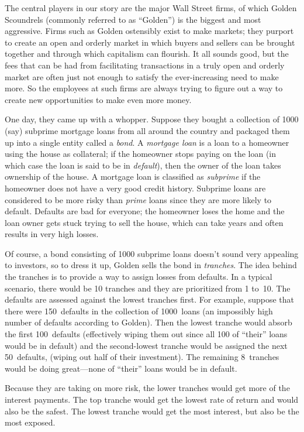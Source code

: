 The central players in our story are the major Wall Street firms, of
which Golden Scoundrels (commonly referred to as ``Golden'') is the
biggest and most aggressive.  Firms such as Golden ostensibly exist to
make markets; they purport to create an open and orderly market in
which buyers and sellers can be brought together and through which
capitalism can flourish.  It all sounds good, but the fees that can be
had from facilitating transactions in a truly open and orderly market
are often just not enough to satisfy the ever-increasing need to make
more.  So the employees at such firms are always trying to figure out
a way to create new opportunities to make even more money.

One day, they came up with a whopper.  Suppose they bought a
collection of 1000 (say) subprime mortgage loans from all around the
country and packaged them up into a single entity called a
\emph{bond}.  A \emph{mortgage loan} is a loan to a homeowner using
the house as collateral; if the homeowner stops paying on the loan (in
which case the loan is said to be in \emph{default}), then the owner
of the loan takes ownership of the house.  A mortgage loan is
classified as \emph{subprime} if the homeowner does not have a very
good credit history.  Subprime loans are considered to be more risky
than \emph{prime} loans since they are more likely to default.
Defaults are bad for everyone; the homeowner loses the home and the
loan owner gets stuck trying to sell the house, which can take years
and often results in very high losses.

Of course, a bond consisting of 1000 subprime loans doesn't sound very
appealing to investors, so to dress it up, Golden sells the bond in
\emph{tranches}.  The idea behind the tranches is to provide a way to
assign losses from defaults.  In a typical scenario, there would be 10
tranches and they are prioritized from 1 to~10.  The defaults are
assessed against the lowest tranches first.  For example, suppose that
there were 150~defaults in the collection of 1000~loans (an impossibly
high number of defaults according to Golden).  Then the lowest tranche
would absorb the first 100~defaults (effectively wiping them out since
all 100 of ``their'' loans would be in default) and the second-lowest
tranche would be assigned the next 50~defaults, (wiping out half of
their investment).  The remaining 8~tranches would be doing
great---none of ``their'' loans would be in default.

Because they are taking on more risk, the lower tranches would get
more of the interest payments.  The top tranche would get the lowest
rate of return and would also be the safest.  The lowest tranche would
get the most interest, but also be the most exposed.

